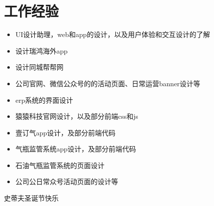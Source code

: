 \documentclass{resume}
\begin{document}
\section{工作经验}
\begin{itemize}
  \item UI设计助理，web和app的设计，以及用户体验和交互设计的了解
\end{itemize}
\begin{itemize}
  \item 设计瑞鸿海外app
  \item 设计同城帮帮网
  \item 公司官网、微信公众号的的活动页面、日常运营banner设计等
\end{itemize}
\begin{itemize}
  \item erp系统的界面设计
  \item 猿猿科技官网设计，以及部分前端css和js
\end{itemize}
\begin{itemize}
  \item 壹订气app设计，及部分前端代码
  \item 气瓶监管系统app设计，及部分前端代码
  \item 石油气瓶监管系统的页面设计
  \item 公司公日常众号活动页面的设计等
\end{itemize}
史蒂夫圣诞节快乐
\end{document}
